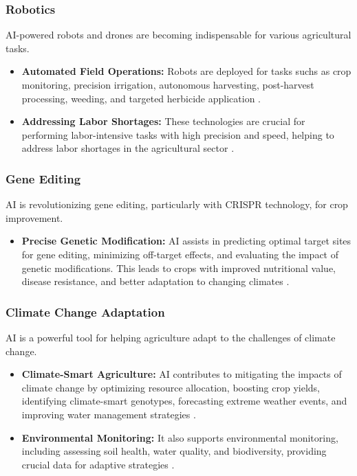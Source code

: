 \subsubsection{Robotics}
AI-powered robots and drones are becoming indispensable for various agricultural tasks.
\begin{itemize}
    \item \textbf{Automated Field Operations:} Robots are deployed for tasks suchs as crop monitoring, precision irrigation, autonomous harvesting, post-harvest processing, weeding, and targeted herbicide application \cite{HokuyoUSA_FutureTrends, BASF_Robotics}.
    \item \textbf{Addressing Labor Shortages:} These technologies are crucial for performing labor-intensive tasks with high precision and speed, helping to address labor shortages in the agricultural sector \cite{InnovamarketInsights_Robotics}.
\end{itemize}

\subsubsection{Gene Editing}
AI is revolutionizing gene editing, particularly with CRISPR technology, for crop improvement.
\begin{itemize}
    \item \textbf{Precise Genetic Modification:} AI assists in predicting optimal target sites for gene editing, minimizing off-target effects, and evaluating the impact of genetic modifications. This leads to crops with improved nutritional value, disease resistance, and better adaptation to changing climates \cite{FrontiersIn_GeneEditing_2, JST_GeneEditing}.
\end{itemize}

\subsubsection{Climate Change Adaptation}
AI is a powerful tool for helping agriculture adapt to the challenges of climate change.
\begin{itemize}
    \item \textbf{Climate-Smart Agriculture:} AI contributes to mitigating the impacts of climate change by optimizing resource allocation, boosting crop yields, identifying climate-smart genotypes, forecasting extreme weather events, and improving water management strategies \cite{AronHack_ClimateChange}.
    \item \textbf{Environmental Monitoring:} It also supports environmental monitoring, including assessing soil health, water quality, and biodiversity, providing crucial data for adaptive strategies \cite{MedCraveOnline_FutureTrends}.\end{itemize}

